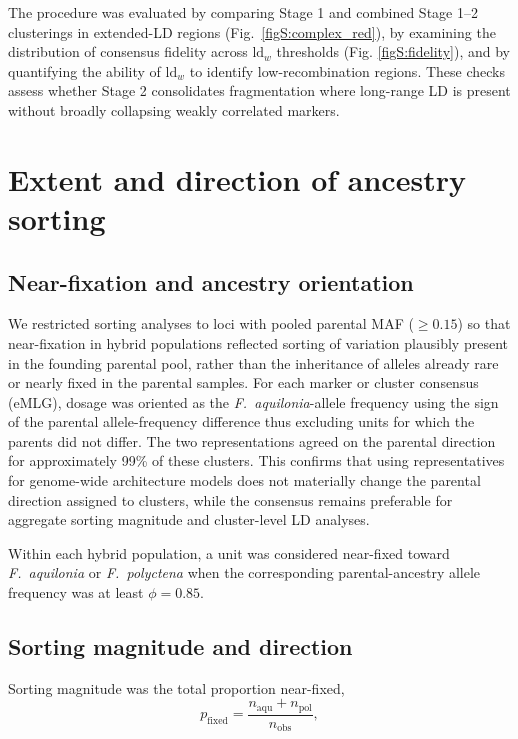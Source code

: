 \documentclass[11pt]{article}
\newcommand{\Faq}{\textit{F.~aquilonia}}
\newcommand{\Fpo}{\textit{F.~polyctena}}
\begin{document}
The procedure was evaluated by comparing Stage 1 and combined Stage 1--2 clusterings in extended-LD regions (Fig.~\ref{figS:complex_red}), by examining the distribution of consensus fidelity across \(\mathrm{ld}_w\) thresholds (Fig. \ref{figS:fidelity}), and by quantifying the ability of \(\mathrm{ld}_w\) to identify low-recombination regions. These checks assess whether Stage 2 consolidates fragmentation where long-range LD is present without broadly collapsing weakly correlated markers.

\section*{Extent and direction of ancestry sorting}

\subsection*{Near-fixation and ancestry orientation}
We restricted sorting analyses to loci with pooled parental MAF ($\ge0.15$) so that near-fixation in hybrid populations reflected sorting of variation plausibly present in the founding parental pool, rather than the inheritance of alleles already rare or nearly fixed in the parental samples. For each marker or cluster consensus (eMLG), dosage was oriented as the \Faq-allele frequency using the sign of the parental allele-frequency difference thus excluding units for which the parents did not differ. The two representations agreed on the parental direction for approximately 99\% of these clusters. This confirms that using representatives for genome-wide architecture models does not materially change the parental direction assigned to clusters, while the consensus remains preferable for aggregate sorting magnitude and cluster-level LD analyses.

Within each hybrid population, a unit was considered near-fixed toward \Faq{} or \Fpo{} when the corresponding parental-ancestry allele frequency was at least \(\phi=0.85\).  

\subsection*{Sorting magnitude and direction}



Sorting magnitude was the total proportion near-fixed,
\begin{equation}
 p_{\mathrm{fixed}}=
 \frac{n_{\mathrm{aqu}}+n_{\mathrm{pol}}}{n_{\mathrm{obs}}},
\end{equation}
\end{document}
